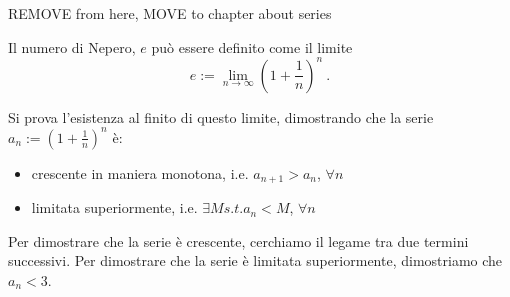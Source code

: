 {\color{red}
\noindent
REMOVE from here, MOVE to chapter about series
\begin{definition} Il numero di Nepero, $e$ può essere definito come il limite
    \begin{equation}
        e := \lim_{n \rightarrow \infty} \left( 1 + \dfrac{1}{n} \right)^n \ .
    \end{equation}
\end{definition}
Si prova l'esistenza al finito di questo limite, dimostrando che la serie $a_n := \left( 1 + \frac{1}{n} \right)^n $ è:
\begin{itemize}
    \item crescente in maniera monotona, i.e. $a_{n+1} > a_n$, $\forall n$
    \item limitata superiormente, i.e. $\exists M s.t. a_n < M$, $\forall n$
\end{itemize}
Per dimostrare che la serie è crescente, cerchiamo il legame tra due termini successivi.
Per dimostrare che la serie è limitata superiormente, dimostriamo che $a_n < 3$.
}

